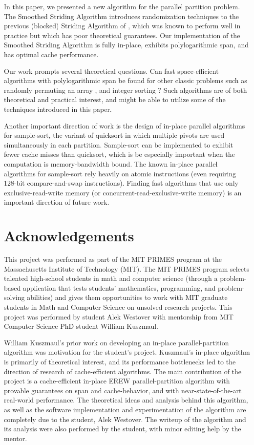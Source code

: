 \documentclass[11pt]{article}
\theoremstyle{remark}
\theoremstyle{remark}
\begin{document}
In this paper, we presented a new algorithm for the parallel partition problem.
The Smoothed Striding Algorithm introduces randomization techniques to the
previous (blocked) Striding Algorithm of \cite{Frias08, FrancisPa92},
which was known to perform well in practice but which has poor theoretical guarantees. 
Our implementation of the
Smoothed Striding Algorithm is fully in-place, exhibits
polylogarithmic span, and has optimal cache performance.

Our work prompts several theoretical questions. Can fast
space-efficient algorithms with polylogarithmic span be found for
other classic problems such as randomly permuting an array
\cite{Anderson90, AlonsoSc96, ShunGu15}, and integer sorting
\cite{Rajasekaran92, HanHe12, AlbersHa97, Han01, GerbessiotisSi04}?
Such algorithms are of both theoretical and practical interest, and
might be able to utilize some of the techniques introduced in this
paper.

Another important direction of work is the design of in-place parallel
algorithms for sample-sort, the variant of quicksort in which multiple
pivots are used simultaneously in each partition. Sample-sort can be
implemented to exhibit fewer cache misses than quicksort, which is be
especially important when the computation is memory-bandwidth
bound. The known in-place parallel algorithms for sample-sort rely
heavily on atomic instructions \cite{AxtmannWi17} (even requiring
128-bit compare-and-swap instructions). Finding fast algorithms that
use only exclusive-read-write memory (or
concurrent-read-exclusive-write memory) is an important direction of
future work.


\section{Acknowledgements}

This project was performed as part of the MIT PRIMES program at the
Massachusetts Institute of Technology (MIT). The MIT PRIMES program
selects talented high-school students in math and computer science
(through a problem-based application that tests students' mathematics,
programming, and problem-solving abilities) and gives them
opportunities to work with MIT graduate students in Math and Computer
Science on unsolved research projects. This project was performed by
student Alek Westover with mentorship from MIT Computer Science PhD
student William Kuszmaul.

William Kuszmaul's prior work on developing an in-place parallel-partition algorithm was motivation for the student's project.
Kuszmaul's in-place algorithm is primarily of theoretical interest, and its performance bottlenecks led to the direction of research of cache-efficient algorithms.
The main contribution of the project is a cache-efficient in-place EREW parallel-partition algorithm with provable guarantees on span and cache-behavior, and with near-state-of-the-art real-world performance.
  The theoretical ideas and analysis behind this algorithm, as well as the software implementation and experimentation of the algorithm are completely due to the student, Alek Westover. The writeup of the algorithm and its analysis were also performed by the student, with minor editing help by the mentor.
\end{document}
